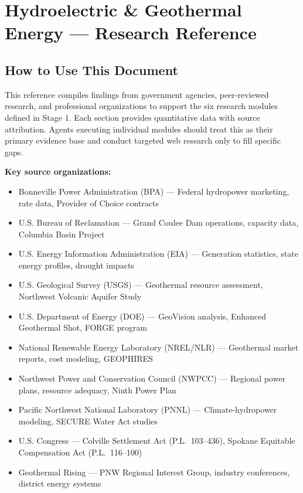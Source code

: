 \documentclass[11pt,letterpaper]{article}
\newcommand{\stageheader}[2]{%
  \noindent\colorbox{#2}{\makebox[\textwidth][l]{%
    \textcolor{white}{\bfseries\sffamily\hspace{6pt}#1\hspace{6pt}}}}%
  \vspace{0.5em}\par%
}
\begin{document}
\newpage

\stageheader{STAGE 2 --- RESEARCH REFERENCE}{secondary}

\section{Hydroelectric \& Geothermal Energy --- Research Reference}

\subsection{How to Use This Document}

This reference compiles findings from government agencies, peer-reviewed research, and professional organizations to support the six research modules defined in Stage 1. Each section provides quantitative data with source attribution. Agents executing individual modules should treat this as their primary evidence base and conduct targeted web research only to fill specific gaps.

\textbf{Key source organizations:}
\begin{itemize}[leftmargin=2em]
\item Bonneville Power Administration (BPA) --- Federal hydropower marketing, rate data, Provider of Choice contracts
\item U.S. Bureau of Reclamation --- Grand Coulee Dam operations, capacity data, Columbia Basin Project
\item U.S. Energy Information Administration (EIA) --- Generation statistics, state energy profiles, drought impacts
\item U.S. Geological Survey (USGS) --- Geothermal resource assessment, Northwest Volcanic Aquifer Study
\item U.S. Department of Energy (DOE) --- GeoVision analysis, Enhanced Geothermal Shot, FORGE program
\item National Renewable Energy Laboratory (NREL/NLR) --- Geothermal market reports, cost modeling, GEOPHIRES
\item Northwest Power and Conservation Council (NWPCC) --- Regional power plans, resource adequacy, Ninth Power Plan
\item Pacific Northwest National Laboratory (PNNL) --- Climate-hydropower modeling, SECURE Water Act studies
\item U.S. Congress --- Colville Settlement Act (P.L.\ 103--436), Spokane Equitable Compensation Act (P.L.\ 116--100)
\item Geothermal Rising --- PNW Regional Interest Group, industry conferences, district energy systems
\end{itemize}
\end{document}
